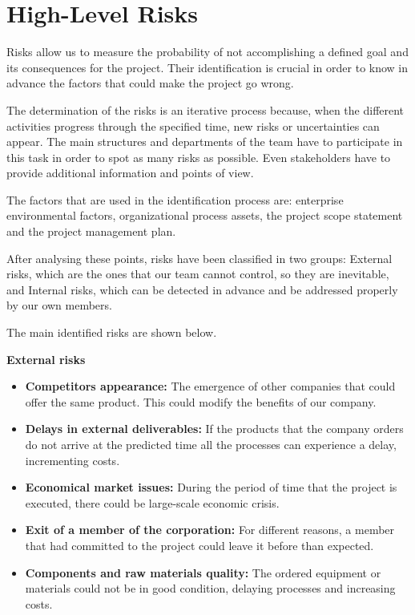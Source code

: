 \section{High-Level Risks}

Risks allow us to measure the probability of not accomplishing a defined goal and its consequences for the project. Their identification is crucial in order to know in advance the factors that could make the project go wrong.

The determination of the risks is an iterative process because, when the different activities progress through the specified time, new risks or uncertainties can appear. The main structures and departments of the team have to participate in this task in order to spot as many risks as possible. Even stakeholders have to provide additional information and points of view.

The factors that are used in the identification process are: enterprise environmental factors, organizational process assets, the project scope statement and the project management plan.

After analysing these points, risks have been classified in two groups: External risks, which are the ones that our team cannot control, so they are inevitable, and Internal risks, which can be detected in advance and be addressed properly by our own members.

The main identified risks are shown below.

\textbf{External risks}

\begin{itemize}
	
	\item \textbf{Competitors appearance:} The emergence of other companies that could offer the same product. This could modify the benefits of our company.
	
	\item \textbf{Delays in external deliverables:} If the products that the company orders do not arrive at the predicted time all the processes can experience a delay, incrementing costs.
	
	\item \textbf{Economical market issues:} During the period of time that the project is executed, there could be large-scale economic crisis.
	
	\item \textbf{Exit of a member of the corporation:} For different reasons, a member that had committed to the project could leave it before than expected.
	
	\item \textbf{Components and raw materials quality:} The ordered equipment or materials could not be in good condition, delaying processes and increasing costs.
	
\end{itemize}

